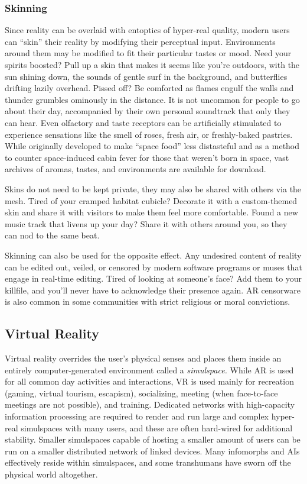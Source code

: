 \subsubsection{Skinning}

Since reality can be overlaid with entoptics of hyper-real 
quality, modern users can ``skin'' their reality by modifying
their perceptual input. Environments around them
may be modified to fit their particular tastes or mood. 
Need your spirits boosted? Pull up a skin that makes it 
seems like you're outdoors, with the sun shining down, 
the sounds of gentle surf in the background, and butterflies
drifting lazily overhead. Pissed off? Be comforted as
flames engulf the walls and thunder grumbles ominously 
in the distance. It is not uncommon for people to go 
about their day, accompanied by their own personal 
soundtrack that only they can hear. Even olfactory and 
taste receptors can be artificially stimulated to experience
sensations like the smell of roses, fresh air, or freshly-baked
pastries. While originally developed to make
``space food'' less distasteful and as a method to counter 
space-induced cabin fever for those that weren't born in 
space, vast archives of aromas, tastes, and environments 
are available for download.

Skins do not need to be kept private, they may 
also be shared with others via the mesh. Tired of 
your cramped habitat cubicle? Decorate it with a 
custom-themed skin and share it with visitors to make 
them feel more comfortable. Found a new music track 
that livens up your day? Share it with others around 
you, so they can nod to the same beat.

Skinning can also be used for the opposite effect. 
Any undesired content of reality can be edited out, 
veiled, or censored by modern software programs or 
muses that engage in real-time editing. Tired of looking
at someone's face? Add them to your killfile, and
you'll never have to acknowledge their presence again. 
AR censorware is also common in some communities 
with strict religious or moral convictions.

\subsection{Virtual Reality}

Virtual reality overrides the user's physical senses and 
places them inside an entirely computer-generated 
environment called a \textit{simulspace.} While AR is used 
for all common day activities and interactions, VR is 
used mainly for recreation (gaming, virtual tourism, 
escapism), socializing, meeting (when face-to-face 
meetings are not possible), and training. Dedicated 
networks with high-capacity information processing 
are required to render and run large and complex 
hyper-real simulspaces with many users, and these 
are often hard-wired for additional stability. Smaller 
simulspaces capable of hosting a smaller amount of 
users can be run on a smaller distributed network of 
linked devices. Many infomorphs and AIs effectively 
reside within simulspaces, and some transhumans 
have sworn off the physical world altogether.

